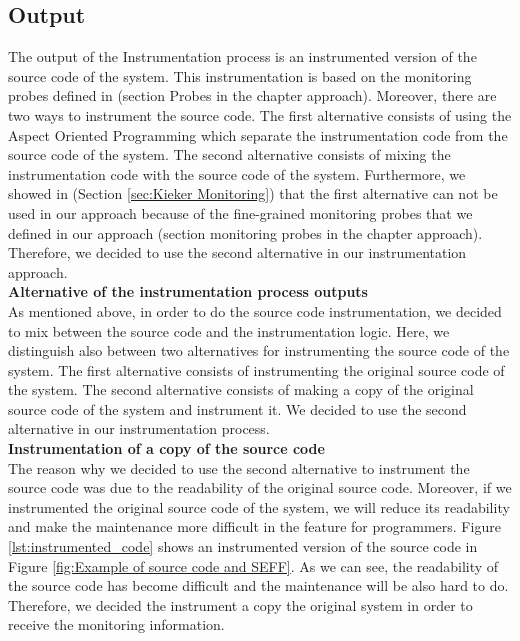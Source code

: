 \subsection{Output}
\label{sec:output}

The output of the Instrumentation process is an instrumented version of the source code of the system.  This instrumentation is based on the monitoring probes defined in (section Probes in the chapter approach). Moreover, there are two ways to instrument the source code. The first alternative consists of using the Aspect Oriented Programming which separate the instrumentation code from the source code of the system. The second alternative consists of mixing the instrumentation code with the source code of the system. Furthermore, we showed in (Section \ref{sec:Kieker Monitoring}) that the first alternative can not be used in our approach because of the fine-grained monitoring probes that we defined in our approach (section monitoring probes in the chapter approach). Therefore, we decided to use the second alternative in our instrumentation approach.\\

\textbf{Alternative of the instrumentation process outputs}\\
As mentioned above, in order to do the source code instrumentation, we decided to mix between the source code and the instrumentation logic.  Here, we distinguish also between two alternatives for instrumenting the source code of the system. The first alternative consists of instrumenting the original source code of the system. The second alternative consists of making a copy of the original source code of the system and instrument it. We decided to use the second alternative in our instrumentation process. \\

\textbf{Instrumentation of a copy of the source code}\\
The reason why we decided to use the second alternative to instrument the source code was due to the readability of the original source code. Moreover, if we instrumented the original source code of the system, we will reduce its readability and make the maintenance more difficult in the feature for programmers. Figure \ref{lst:instrumented_code} shows an instrumented version of the source code in Figure \ref{fig:Example of source code and SEFF}. As we can see, the readability of the source code has become difficult and the maintenance will be also hard to do. Therefore, we decided the instrument a copy the original system in order to receive the monitoring information.



